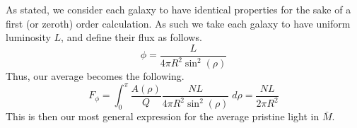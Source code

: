 \documentclass[a4paper]{article}
\begin{document}
    As stated, we consider each galaxy to have identical properties for the
    sake of a first (or zeroth) order calculation. As such we take each galaxy
    to have uniform luminosity $L$, and define their flux as follows.
    \begin{equation}
        \phi = \frac{L}{4\pi R^2 \sin^2(\rho)} 
    \end{equation}
    Thus, our average becomes the following.
    \begin{equation}
        F_{\phi} = \int_0^{\pi}\frac{A(\rho)}{Q} \frac{NL}{4 \pi R^2
               \sin^2(\rho)}\;d\rho = \frac{NL}{2 \pi R^2} 
    \end{equation}
    This is then our most general expression for the average pristine light in
    $\bar{M}$.

\end{document}
